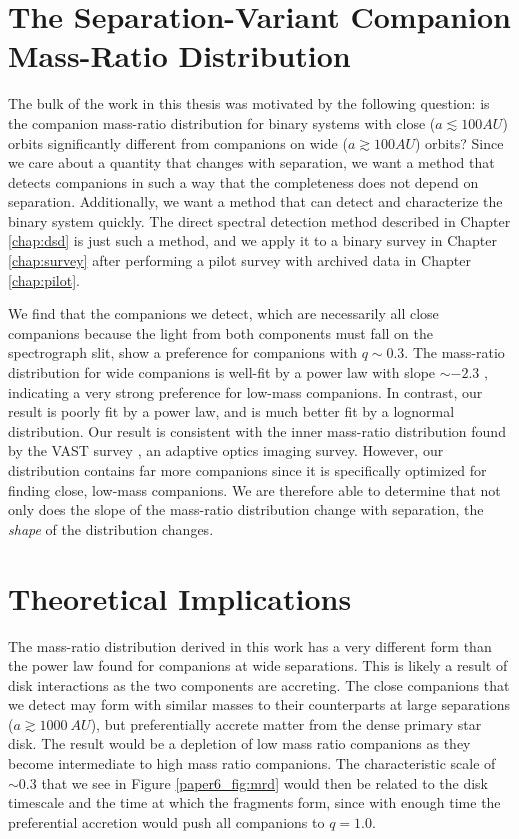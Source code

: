 \documentclass{utthesis}
\begin{document}
\section{The Separation-Variant Companion Mass-Ratio Distribution}

The bulk of the work in this thesis was motivated by the following question: is the companion mass-ratio distribution for binary systems with close ($a \lesssim 100 AU$) orbits significantly different from companions on wide ($a \gtrsim 100 AU$) orbits? Since we care about a quantity that changes with separation, we want a method that detects companions in such a way that the completeness does not depend on separation. Additionally, we want a method that can detect and characterize the binary system quickly. The direct spectral detection method described in Chapter \ref{chap:dsd} is just such a method, and we apply it to a binary survey in Chapter \ref{chap:survey} after performing a pilot survey with archived data in Chapter \ref{chap:pilot}.

We find that the companions we detect, which are necessarily all close companions because the light from both components must fall on the spectrograph slit, show a preference for companions with $q \sim 0.3$. The mass-ratio distribution for wide companions is well-fit by a power law with slope $\sim -2.3$ \citep{DeRosa2014}, indicating a very strong preference for low-mass companions. In contrast, our result is poorly fit by a power law, and is much better fit by a lognormal distribution. Our result is consistent with the inner mass-ratio distribution found by the VAST survey \citep{DeRosa2014}, an adaptive optics imaging survey. However, our distribution contains far more companions since it is specifically optimized for finding close, low-mass companions. We are therefore able to determine that not only does the slope of the mass-ratio distribution change with separation, the \emph{shape} of the distribution changes.

\section{Theoretical Implications}

The mass-ratio distribution derived in this work has a very different form than the power law found for companions at wide separations. This is likely a result of disk interactions as the two components are accreting. The close companions that we detect may form with similar masses to their counterparts at large separations ($a \gtrsim 1000\ AU$), but preferentially accrete matter from the dense primary star disk. The result would be a depletion of low mass ratio companions as they become intermediate to high mass ratio companions. The characteristic scale of $\sim 0.3$ that we see in Figure \ref{paper6_fig:mrd} would then be related to the disk timescale and the time at which the fragments form, since with enough time the preferential accretion would push all companions to $q = 1.0$. 
\end{document}
